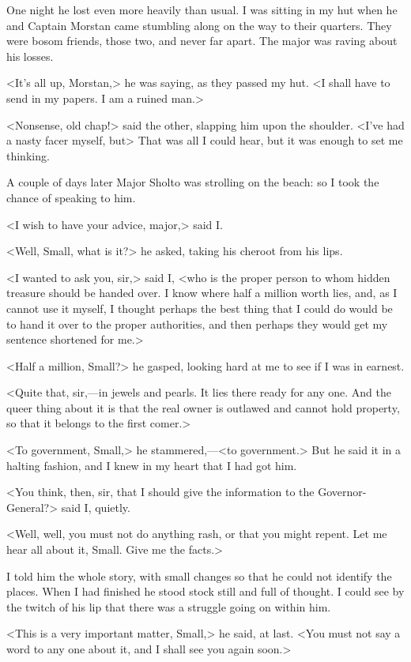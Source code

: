One night he lost even more heavily than usual. I was sitting in my hut when he and Captain Morstan came stumbling along on the way to their quarters. They were bosom friends, those two, and never far apart. The major was raving about his losses.

<It's all up, Morstan,> he was saying, as they passed my hut. <I shall have to send in my papers. I am a ruined man.>

<Nonsense, old chap!> said the other, slapping him upon the shoulder. <I've had a nasty facer myself, but\longdash> That was all I could hear, but it was enough to set me thinking.

A couple of days later Major Sholto was strolling on the beach: so I took the chance of speaking to him.

<I wish to have your advice, major,> said I\@.

<Well, Small, what is it?> he asked, taking his cheroot from his lips.

<I wanted to ask you, sir,> said I, <who is the proper person to whom hidden treasure should be handed over. I know where half a million worth lies, and, as I cannot use it myself, I thought perhaps the best thing that I could do would be to hand it over to the proper authorities, and then perhaps they would get my sentence shortened for me.>

<Half a million, Small?> he gasped, looking hard at me to see if I was in earnest.

<Quite that, sir,—in jewels and pearls. It lies there ready for any one. And the queer thing about it is that the real owner is outlawed and cannot hold property, so that it belongs to the first comer.>

<To government, Small,> he stammered,—<to government.> But he said it in a halting fashion, and I knew in my heart that I had got him.

<You think, then, sir, that I should give the information to the Governor-General?> said I, quietly.

<Well, well, you must not do anything rash, or that you might repent. Let me hear all about it, Small. Give me the facts.>

I told him the whole story, with small changes so that he could not identify the places. When I had finished he stood stock still and full of thought. I could see by the twitch of his lip that there was a struggle going on within him.

<This is a very important matter, Small,> he said, at last. <You must not say a word to any one about it, and I shall see you again soon.>

